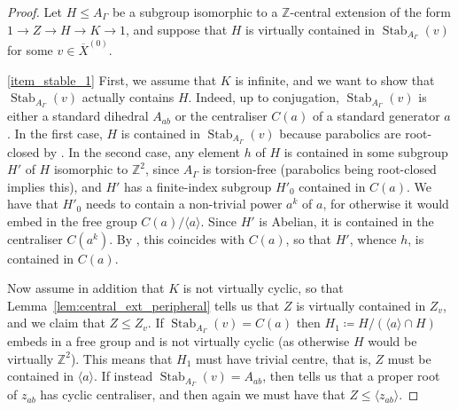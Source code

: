 \documentclass[svgnames]{amsart}
\theoremstyle{plain}
\theoremstyle{definition}
\newcommand{\Z}{\mathbb{Z}}
\newcommand{\ov}[1]{\overline{#1}}
\newcommand{\Stab}[2]{\operatorname{Stab}_{#1}(#2)}
\begin{document}
\begin{proof}
Let $H\le A_\Gamma$ be a subgroup isomorphic to a $\mathbb Z$-central extension of the form $1\to Z\to H\to K\to 1$, and suppose that $H$ is virtually contained in $\Stab{A_\Gamma}{v}$ for some $v\in \ov X^{(0)}$.
\par\medskip
\eqref{item_stable_1} First, we assume that $K$ is infinite, and we want to show that $\Stab{A_\Gamma}{v}$ actually contains $H$. Indeed, up to conjugation, $\Stab{A_\Gamma}{v}$ is either a standard dihedral $A_{ab}$ or the centraliser $C(a)$ of a standard generator $a$. In the first case, $H$ is contained in $\Stab{A_\Gamma}{v}$ because parabolics are root-closed by \cite[Theorem D]{CMV:parabolics}. In the second case, any element $h$ of $H$ is contained in some subgroup $H'$ of $H$ isomorphic to $\mathbb Z^2$, since $A_\Gamma$ is torsion-free (parabolics being root-closed implies this), and $H'$ has a finite-index subgroup $H'_0$ contained in $C(a)$. We have that $H'_0$ needs to contain a non-trivial power $a^k$ of $a$, for otherwise it would embed in the free group $C(a)/\langle a\rangle$. Since $H'$ is Abelian, it is contained in the centraliser $C(a^k)$. By \cite[Corollary 5.3]{paris_artin_groups}, this coincides with $C(a)$, so that $H'$, whence $h$, is contained in $C(a)$.

Now assume in addition that $K$ is not virtually cyclic, so that Lemma~\ref{lem:central_ext_peripheral} tells us that $Z$ is virtually contained in $Z_v$, and we claim that $Z\le Z_v$. If $\Stab{A_\Gamma}{v}=C(a)$ then $H_1\coloneq H/(\langle a\rangle \cap H)$ embeds in a free group and is not virtually cyclic (as otherwise $H$ would be virtually $\Z^2$). This means that $H_1$ must have trivial centre, that is, $Z$ must be contained in $\langle a\rangle$. If instead $\Stab{A_\Gamma}{v}=A_{ab}$, then \cite[Remark 3.6.(2)]{MV:centralisers} tells us that a proper root of $z_{ab}$ has cyclic centraliser, and then again we must have that $Z\le \langle z_{ab}\rangle$.


\end{proof}
\end{document}
